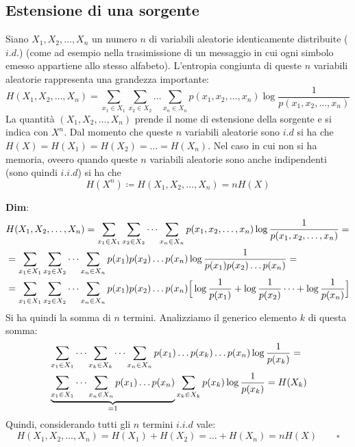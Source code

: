 \subsection{Estensione di una sorgente}
Siano $X_1, X_2, \dots, X_n$ un numero $n$ di variabili aleatorie identicamente distribuite ($i.d.$) (come ad esempio nella trasimissione di un messaggio in cui ogni simbolo emesso appartiene allo stesso alfabeto). L'entropia congiunta di queste $n$ variabili aleatorie rappresenta una grandezza importante:
\begin{equation}
    H(X_1, X_2, \dots, X_n) = \sum_{x_1 \in X_1} \sum_{x_2 \in X_2} \dots \sum_{x_n \in X_n} p(x_1, x_2, \dots, x_n) \log \frac{1}{p(x_1, x_2, \dots, x_n)}
\end{equation}
 La quantit\`a $(X_1, X_2, \dots, X_n)$ prende il nome di estensione della sorgente e si indica con $X^n$. Dal momento che queste $n$ variabili aleatorie sono $i.d$ si ha che $H(X) = H(X_1) = H(X_2) = \dots = H(X_n)$. Nel caso in cui non si ha memoria, oveero quando queste $n$ variabili aleatorie sono anche indipendenti (sono quindi $i.i.d$) si ha che
\begin{equation}
    H(X^n) \coloneqq H(X_1, X_2, \dots, X_n) = nH(X)
\end{equation}
\begin{tcolorbox}
\textbf{Dim}:
\begin{align*}
    &H(X_1, X_2, \dots, X_n) = \sum_{x_1 \in X_1} \sum_{x_2 \in X_2} \dots \sum_{x_n \in X_n} p(x_1, x_2, \dots, x_n) \log \frac{1}{p(x_1, x_2, \dots, x_n)} = \\
    &=\sum_{x_1 \in X_1} \sum_{x_2 \in X_2} \dots \sum_{x_n \in X_n} p(x_1)p(x_2)\dots p(x_n) \log \frac{1}{p(x_1)p(x_2)\dots p(x_n)} = \\
    &=\sum_{x_1 \in X_1} \sum_{x_2 \in X_2} \dots \sum_{x_n \in X_n} p(x_1)p(x_2)\dots p(x_n) \Big [ \log \frac{1}{p({x_1})} + \log \frac{1}{p({x_2})} \dots + \log \frac{1}{p({x_n})} \Big]
\end{align*}
Si ha quindi la somma di $n$ termini. Analizziamo il generico elemento $k$ di questa somma:
\begin{align*}
    &\sum_{x_1 \in X_1} \dots \sum_{x_k \in X_k} \dots \sum_{x_n \in X_n} p(x_1) \dots p(x_k) \dots p(x_n) \log \frac{1}{p({x_k})} = \\
    &\underbrace{\sum_{x_1 \in X_1} \dots \sum_{x_n \in X_n} p(x_1) \dots p(x_n)}_{=1} \sum_{x_k \in X_k} p(x_k) \log \frac{1}{p({x_k})} = H(X_k)
\end{align*}
Quindi, considerando tutti gli $n$ termini $i.i.d$ vale:
\[
H(X_1, X_2, \dots, X_n) = H(X_1) + H(X_2) = \dots + H(X_n) = n H(X) \qquad \square
\]
\end{tcolorbox}
